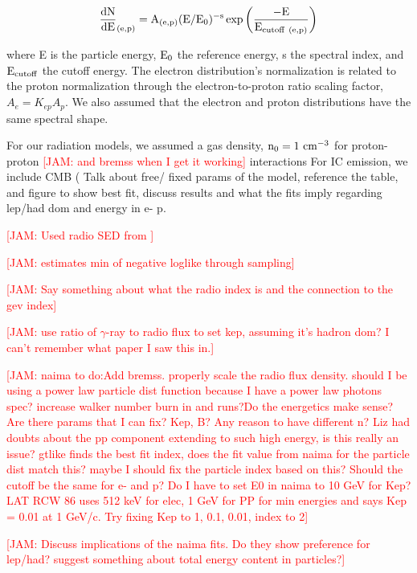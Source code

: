 \documentclass[iop]{emulateapj}
\newcommand{\kibitz}[2]{\ifnum\Comments=1\textcolor{#1}{#2}\fi}
\newcommand{\jamie}[1]{\kibitz{red}      {[JAM: #1]}}
\newcommand{\gam}{$\gamma$-ray}
\begin{document}
\begin{equation}\label{eq:ecpl}
{\rm \frac{dN}{dE}_{(e,p)} = A_{(e,p)} (E / E_0) ^{-s} \exp {\bigg ( }\frac{- E}{ E_{cutoff~(e,p)}}{\bigg)}}
\end{equation}

where E is the particle energy, ${\rm E_0}$ the reference energy, s the spectral index, and ${\rm E_{cutoff}}$ the cutoff energy. The electron distribution's normalization is related to the proton normalization through the electron-to-proton ratio scaling factor, $A_e = K_{ep} A_p$. We also assumed that the electron and proton distributions have the same spectral shape.

For our radiation models, we assumed a gas density, ${\rm n_0 = 1~cm^{-3}}$ for proton-proton \jamie{and bremss when I get it working} interactions For IC emission, we include CMB  (
Talk about free/ fixed params of the model, reference the table, and figure to show best fit, discuss results and what the fits imply regarding lep/had dom and energy in e- p.

\jamie{Used radio SED from \citep{Gerbrandt14}}



\jamie{estimates min of negative loglike through sampling}	

\jamie{Say something about what the radio index is and the connection to the gev index}

\jamie{use ratio of \gam{} to radio flux to set kep, assuming it's hadron dom? I can't remember what paper I saw  this in.}

\jamie{naima to do:Add bremss. properly scale the radio flux density. should I be using a power law particle dist function because I have a power law photons spec? increase walker number burn in and runs?Do the energetics make sense? Are there params that I can fix? Kep, B? Any reason to have different n? Liz had doubts about the pp component extending to such high energy, is this really an issue? gtlike finds the best fit index, does the fit value from naima for the particle dist match this? maybe I should fix the particle index based on this? Should the cutoff be the same for e- and p? Do I have to set E0 in naima to 10 GeV for Kep? LAT RCW 86 uses 512 keV for elec, 1 GeV for PP for min energies and says Kep = 0.01 at 1 GeV/c. Try fixing Kep to 1, 0.1, 0.01, index to 2}

\jamie{Discuss implications of the naima fits. Do they show preference for lep/had? suggest something about total energy content in particles?}
\end{document}
